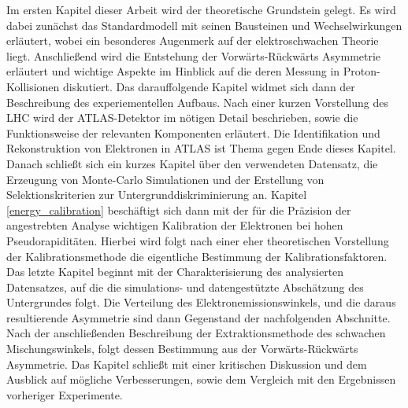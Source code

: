 Im ersten Kapitel dieser Arbeit wird der theoretische Grundstein gelegt. Es
wird dabei zunächst das Standardmodell mit seinen Bausteinen und
Wechselwirkungen erläutert, wobei ein besonderes Augenmerk auf der
elektroschwachen Theorie liegt. Anschließend wird die Entstehung der
Vorwärts-Rückwärts Asymmetrie erläutert und wichtige Aspekte im Hinblick auf
die deren Messung in Proton-Kollisionen diskutiert. Das darauffolgende Kapitel
widmet sich dann der Beschreibung des experiementellen Aufbaus. Nach einer
kurzen Vorstellung des \acf{LHC} wird der ATLAS-Detektor im nötigen Detail
beschrieben, sowie die Funktionsweise der relevanten Komponenten erläutert. Die
Identifikation und Rekonstruktion von Elektronen in ATLAS ist Thema gegen Ende
dieses Kapitel. Danach schließt sich ein kurzes Kapitel über den verwendeten
Datensatz, die Erzeugung von Monte-Carlo Simulationen und der Erstellung von
Selektionskriterien zur Untergrunddiskriminierung an. Kapitel
\ref{energy_calibration} beschäftigt sich dann mit der für die Präzision der
angestrebten Analyse wichtigen Kalibration der Elektronen bei hohen
Pseudorapiditäten. Hierbei wird folgt nach einer eher theoretischen Vorstellung
der Kalibrationsmethode die eigentliche Bestimmung der Kalibrationsfaktoren.
Das letzte Kapitel beginnt mit der Charakterisierung des analysierten
Datensatzes, auf die die simulations- und datengestützte Abschätzung des
Untergrundes folgt. Die Verteilung des Elektronemissionswinkels, und die daraus
resultierende Asymmetrie sind dann Gegenstand der nachfolgenden Abschnitte.
Nach der anschließenden Beschreibung der Extraktionsmethode des schwachen
Mischungswinkels, folgt dessen Bestimmung aus der Vorwärts-Rückwärts
Asymmetrie. Das Kapitel schließt mit einer kritischen Diskussion und dem
Ausblick auf mögliche Verbesserungen, sowie dem Vergleich mit den Ergebnissen
vorheriger Experimente.
